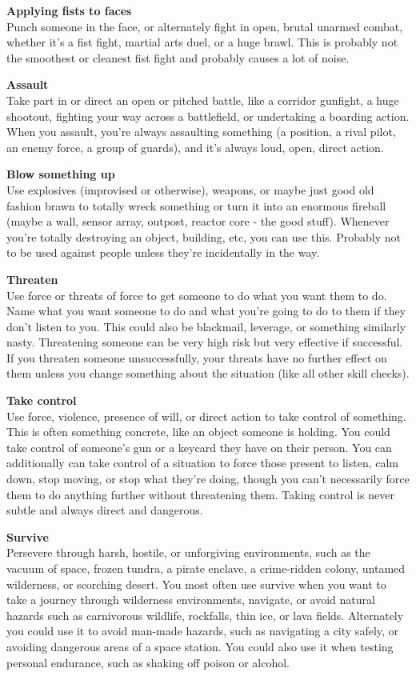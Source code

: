 \textbf{Applying fists to faces}\\ 
Punch someone in the face, or alternately fight in open, brutal unarmed combat, whether it’s a fist fight, martial arts duel, or a huge brawl. This is probably not the smoothest or cleanest fist fight and probably causes a lot of noise.

\textbf{Assault}\\
Take part in or direct an open or pitched battle, like a corridor gunfight, a huge shootout, fighting your way across a battlefield, or undertaking a boarding action. When you assault, you’re always assaulting something (a position, a rival pilot, an enemy force, a group of guards), and it’s always loud, open, direct action.

\textbf{Blow something up}\\
Use explosives (improvised or otherwise), weapons, or maybe just good old fashion brawn to totally wreck something or turn it into an enormous fireball (maybe a wall, sensor array, outpost, reactor core - the good stuff). Whenever you’re totally destroying an object, building, etc, you can use this. Probably not to be used against people unless they’re incidentally in the way.

\textbf{Threaten}\\
Use force or threats of force to get someone to do what you want them to do. Name what you want someone to do and what you’re going to do to them if they don’t listen to you. This could also be blackmail, leverage, or something similarly nasty. Threatening someone can be very high risk but very effective if successful. If you threaten someone unsuccessfully, your threats have no further effect on them unless you change something about the situation (like all other skill checks).

\textbf{Take control}\\
Use force, violence, presence of will, or direct action to take control of something. This is often something concrete, like an object someone is holding. You could take control of someone’s gun or a keycard they have on their person. You can additionally can take control of a situation to force those present to listen, calm down, stop moving, or stop what they’re doing, though you can’t necessarily force them to do anything further without threatening them. Taking control is never subtle and always direct and dangerous.

\textbf{Survive}\\
Persevere through harsh, hostile, or unforgiving environments, such as the vacuum of space, frozen tundra, a pirate enclave, a crime-ridden colony, untamed wilderness, or scorching desert. You most often use survive when you want to take a journey through wilderness environments, navigate, or avoid natural hazards such as carnivorous wildlife, rockfalls, thin ice, or lava fields. Alternately you could use it to avoid man-made hazards, such as navigating a city safely, or avoiding dangerous areas of a space station. You could also use it when testing personal endurance, such as shaking off poison or alcohol.


